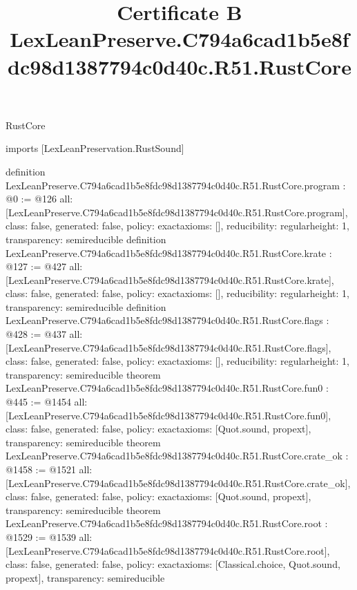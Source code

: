 \begin{lexlean}{RustCore}
\title{Certificate B LexLeanPreserve.C794a6cad1b5e8fdc98d1387794c0d40c.R51.RustCore}
\begin{coremodule}
imports [LexLeanPreservation.RustSound]

definition LexLeanPreserve.C794a6cad1b5e8fdc98d1387794c0d40c.R51.RustCore.program : @0 := @126 {
  all: [LexLeanPreserve.C794a6cad1b5e8fdc98d1387794c0d40c.R51.RustCore.program],
  class: false,
  generated: false,
  policy: exact{axioms: []},
  reducibility: regular{height: 1},
  transparency: semireducible
}
definition LexLeanPreserve.C794a6cad1b5e8fdc98d1387794c0d40c.R51.RustCore.krate : @127 := @427 {
  all: [LexLeanPreserve.C794a6cad1b5e8fdc98d1387794c0d40c.R51.RustCore.krate],
  class: false,
  generated: false,
  policy: exact{axioms: []},
  reducibility: regular{height: 1},
  transparency: semireducible
}
definition LexLeanPreserve.C794a6cad1b5e8fdc98d1387794c0d40c.R51.RustCore.flags : @428 := @437 {
  all: [LexLeanPreserve.C794a6cad1b5e8fdc98d1387794c0d40c.R51.RustCore.flags],
  class: false,
  generated: false,
  policy: exact{axioms: []},
  reducibility: regular{height: 1},
  transparency: semireducible
}
theorem LexLeanPreserve.C794a6cad1b5e8fdc98d1387794c0d40c.R51.RustCore.fun0 : @445 := @1454 {
  all: [LexLeanPreserve.C794a6cad1b5e8fdc98d1387794c0d40c.R51.RustCore.fun0],
  class: false,
  generated: false,
  policy: exact{axioms: [Quot.sound, propext]},
  transparency: semireducible
}
theorem LexLeanPreserve.C794a6cad1b5e8fdc98d1387794c0d40c.R51.RustCore.crate_ok : @1458 := @1521 {
  all: [LexLeanPreserve.C794a6cad1b5e8fdc98d1387794c0d40c.R51.RustCore.crate_ok],
  class: false,
  generated: false,
  policy: exact{axioms: [Quot.sound, propext]},
  transparency: semireducible
}
theorem LexLeanPreserve.C794a6cad1b5e8fdc98d1387794c0d40c.R51.RustCore.root : @1529 := @1539 {
  all: [LexLeanPreserve.C794a6cad1b5e8fdc98d1387794c0d40c.R51.RustCore.root],
  class: false,
  generated: false,
  policy: exact{axioms: [Classical.choice, Quot.sound, propext]},
  transparency: semireducible
}


\end{coremodule}
\end{lexlean}

